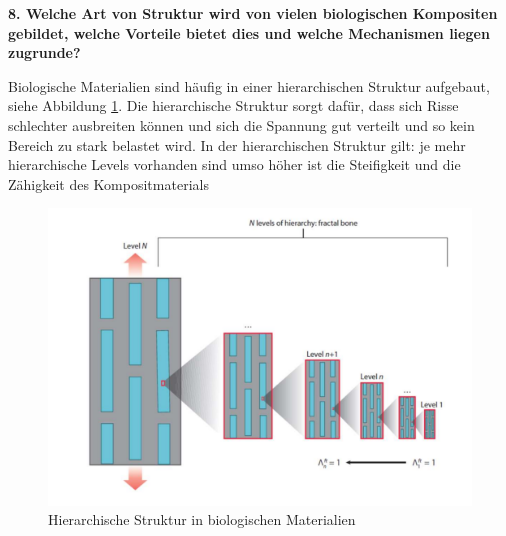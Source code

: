 \noindent\textbf{8. Welche Art von Struktur wird von vielen biologischen Kompositen gebildet, welche Vorteile bietet dies und welche Mechanismen liegen zugrunde?}\\
\begin{addmargin}[25pt]{0pt}
Biologische Materialien sind häufig in einer hierarchischen Struktur aufgebaut, siehe Abbildung \ref{fig:hierarchie}. Die hierarchische Struktur sorgt dafür, dass sich Risse schlechter ausbreiten können und sich die Spannung gut verteilt und so kein Bereich zu stark belastet wird. In der hierarchischen Struktur gilt: je mehr hierarchische Levels vorhanden sind umso höher ist die Steifigkeit und die Zähigkeit des Kompositmaterials \\
\begin{figure}[h]
    \centering
    \includegraphics[scale = 0.85]{images/Materialwissenschaften/hierarchische_struktur.png}
    \caption{Hierarchische Struktur in biologischen Materialien}
    \label{fig:hierarchie}
\end{figure}
\end{addmargin}

